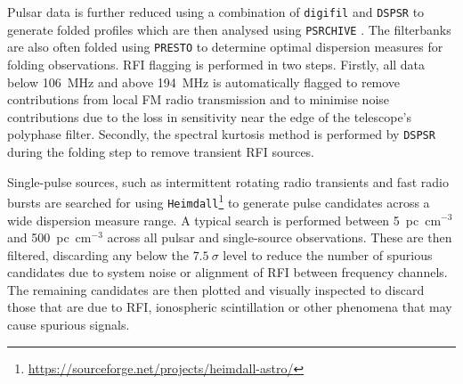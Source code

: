 Pulsar data is further reduced using a combination of \texttt{digifil} and \texttt{DSPSR} \citep{vanStraten2011} to generate folded profiles which are then analysed using \texttt{PSRCHIVE} \citep{Hotan2004}. The filterbanks are also often folded using \texttt{PRESTO} \citep{Ransom2001} to determine optimal dispersion measures for folding observations. RFI flagging is performed in two steps. Firstly, all data below 106~MHz and above 194~MHz is automatically flagged to remove contributions from local FM radio transmission and to minimise noise contributions due to the loss in sensitivity near the edge of the telescope's polyphase filter. Secondly, the spectral kurtosis method is performed by \texttt{DSPSR} during the folding step to remove transient RFI sources.

Single-pulse sources, such as intermittent rotating radio transients \citep[RRATs;][]{McLaughlin2006} and fast radio bursts \citep[FRBs;][]{Lorimer2007,Thornton2013} are searched for using \texttt{Heimdall}\footnote{\hyperref[Heimdall]{https://sourceforge.net/projects/heimdall-astro/}} to generate pulse candidates across a wide dispersion measure range. A typical search is performed between 5~pc~cm$^{-3}$ and 500~pc~cm$^{-3}$ across all pulsar and single-source observations. These are then filtered, discarding any below the $7.5~\sigma$ level to reduce the number of spurious candidates due to system noise or alignment of RFI between frequency channels. The remaining candidates are then plotted and visually inspected to discard those that are due to RFI, ionospheric scintillation or other phenomena that may cause spurious signals. 



